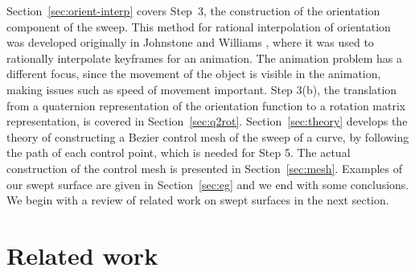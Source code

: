 Section~\ref{sec:orient-interp} covers Step~3,
the construction of the orientation component of the sweep.
This method for rational interpolation of orientation
was developed originally in Johnstone and Williams \cite{jjjimbo94a}, 
where it was used to rationally interpolate keyframes for an animation.
The animation problem has a different focus, since the movement of the object
is visible in the animation, making issues such as speed of movement important.
Step 3(b), the translation from a quaternion representation of the
orientation function to a rotation matrix representation, is covered
in Section~\ref{sec:q2rot}.
Section~\ref{sec:theory} develops the 
theory of constructing a Bezier control mesh of the sweep of a curve,
by following the path of each control point, which is needed for Step 5.
The actual construction of the control mesh is presented in 
Section~\ref{sec:mesh}.
Examples of our swept surface are given in Section~\ref{sec:eg}
and we end with some conclusions.
We begin with a review of related work on swept surfaces in the next section.



\section{Related work}
\label{sec:related}

